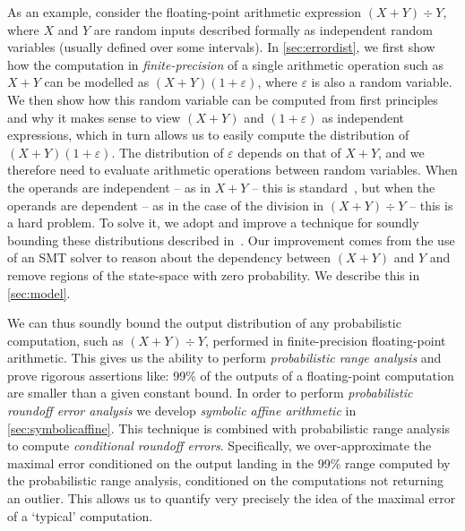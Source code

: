 As an example, consider the floating-point arithmetic expression $(X+Y)\div Y$, where $X$ and $Y$ are random inputs described formally as independent random variables (usually defined over some intervals). In \cref{sec:errordist}, we first show how the computation in \emph{finite-precision} of a single arithmetic operation such as $X+Y$ can be modelled as $(X+Y)(1+\varepsilon)$, where $\varepsilon$ is also a random variable. We then show how this random variable can be computed from first principles and why it makes sense to view $(X+Y)$ and  $(1+\varepsilon)$ as independent expressions, which in turn allows us to easily compute the distribution of $(X+Y)(1+\varepsilon)$.
The distribution of $\varepsilon$ depends on that of $X+Y$, and we therefore need to evaluate arithmetic operations between random variables. When the operands are independent -- as in $X+Y$ -- this is standard~\cite{springer1979algebra}, but when the operands are dependent -- as in the case of the division in $(X+Y)\div Y$ -- this is a hard problem. To solve it, we adopt and improve a technique for soundly bounding these distributions described in~\cite{bouissou2012generalization}.  Our improvement comes from the use of an SMT solver to reason about the dependency between $(X+Y)$ and $Y$ and remove regions of the state-space with zero probability. We describe this in \cref{sec:model}.

We can thus soundly bound the output distribution of any probabilistic computation, such as $(X+Y)\div Y$, performed in finite-precision floating-point arithmetic. This gives us the ability to perform \emph{probabilistic range analysis} and prove rigorous assertions like: 99\% of the outputs of a floating-point computation are smaller than a given constant bound.
In order to perform \emph{probabilistic roundoff error analysis} we develop \emph{symbolic affine arithmetic} in \cref{sec:symbolicaffine}. This technique is combined with probabilistic range analysis to compute \emph{conditional roundoff errors}. Specifically, we over-approximate the maximal error conditioned on the output landing in the 99\% range computed by the probabilistic range analysis, \ie conditioned on the computations not returning an outlier.  This allows us to quantify very precisely the idea of the maximal error of a `typical' computation.

